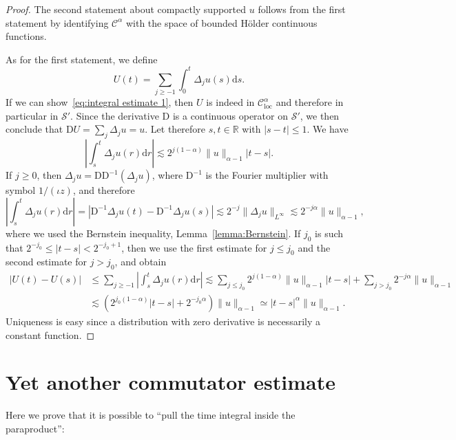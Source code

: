 \documentclass[11pt,a4paper]{article}
\newcommand{\mathD}{\mathrm{D}}
\newcommand{\mathd}{\mathrm{d}}
\newcommand{\tmop}[1]{\ensuremath{\operatorname{#1}}}
\theoremstyle{remark}
\newcommand{\CC}{\ensuremath{\mathscr{C}}}
\newcommand{\CS}{\ensuremath{\mathscr{S}}}
\begin{document}
\begin{proof}
  The second statement about compactly supported $u$ follows from the first statement by identifying $\CC^{\alpha}$ with the space of bounded H{\"o}lder continuous functions.
  
  As for the first statement, we define
  \[
     U ( t ) = \sum_{j \geqslant -1} \int_{0}^{t} \Delta_{j} u ( s ) \mathd s.
  \]
  If we can show~{\eqref{eq:integral estimate 1}}, then $U$ is indeed in $\CC^{\alpha}_{\tmop{loc}}$ and therefore in particular in $\CS'$. Since the derivative $\mathD$ is a continuous operator on $\CS'$, we then conclude that $\mathD U= \sum_{j} \Delta_{j} u=u$. Let therefore $s,t \in \mathbb{R}$ with $| s-t | \leqslant 1$. We have
  \[
     \left| \int_{s}^{t} \Delta_{j} u ( r ) \mathd r \right| \lesssim 2^{j (1- \alpha )} \| u \|_{\alpha -1} | t-s | .
  \]
  If $j \geqslant 0$, then $\Delta_{j} u= \mathD \mathD^{-1} ( \Delta_{j} u)$, where $\mathD^{-1}$ is the Fourier multiplier with symbol $1/ ( \iota  z )$, and therefore
  \[
     \left| \int_{s}^{t} \Delta_{j} u ( r ) \mathd r \right| = | \mathD^{-1} \Delta_{j} u ( t ) - \mathD^{-1} \Delta_{j} u ( s ) | \lesssim 2^{-j} \| \Delta_{j} u \|_{L^{\infty}} \lesssim 2^{-j \alpha} \| u \|_{\alpha -1} ,
  \]
  where we used the Bernstein inequality, Lemma~\ref{lemma:Bernstein}. If $j_{0}$ is such that $2^{-j_{0}} \leqslant | t-s | <2^{-j_{0} +1}$, then we use the first estimate for $j \leqslant j_{0}$ and the second estimate for $j>j_{0}$, and obtain
  \begin{align*}
     | U ( t ) -U ( s ) | &\leqslant \sum_{j \geqslant -1} \left| \int_{s}^{t} \Delta_{j} u ( r ) \mathd r \right| \lesssim \sum_{j \leqslant j_{0}} 2^{j ( 1- \alpha )} \| u \|_{\alpha -1} | t-s | + \sum_{j>j_{0}} 2^{-j \alpha} \| u \|_{\alpha -1} \\
     & \lesssim ( 2^{j_{0} ( 1- \alpha )} | t-s | +2^{-j_{0} \alpha} ) \| u \|_{\alpha -1} \simeq | t-s |^{\alpha} \| u \|_{\alpha -1} .
  \end{align*}
  Uniqueness is easy since a distribution with zero derivative is necessarily a constant function.
\end{proof}



\section{Yet another commutator estimate}\label{sec:convolution commutators}

Here we prove that it is possible to ``pull the time integral inside the paraproduct'':
\end{document}
